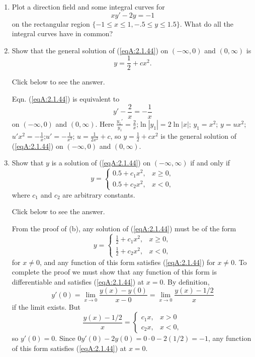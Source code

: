 \documentclass{ximera}
\begin{document}
\begin{problem}\label{exer:2.1.44}
\begin{enumerate}
\item %
Plot a direction field and some integral curves for
\begin{equation}\label{eqA:2.1.44}
    xy'-2y=-1
\end{equation}
on the rectangular region  $\{-1\leq x\leq 1, -.5\leq y\leq 1.5\}$.
What do all the integral curves have in common?

\item \label{part2.1.44b}%
Show that the general solution of (\ref{eqA:2.1.44})
on $(-\infty,0)$ and $(0,\infty)$ is
$$
y=\frac{1}{2}+cx^2.
$$

Click below to see the answer.

\begin{expandable}
    Eqn. (\ref{eqA:2.1.44}) is equivalent to
$$
y'-\frac{2}{ x}=-\frac{1}{ x}
$$
on $(-\infty,0)$ and $(0,\infty)$. Here
$\frac{y_1'}{ y_1}=\frac{2}{ x}$;\quad $\ln|y_1|=2\ln|x|$;\quad
$y_1=x^2$;\quad
$y=ux^2$;\quad $u'x^2=-\frac{1}{ x}$;\quad $u'=-\frac{1}{
x^3}$;\quad
$u=\frac{1}{2x^2}+c$, so $y=\frac{1}{2}+cx^2$ is the general
solution of (\ref{eqA:2.1.44}) on $(-\infty,0)$ and $(0,\infty)$.
\end{expandable}

\item %
Show that $y$ is a solution of (\ref{eqA:2.1.44}) on
$(-\infty,\infty)$ if and only if
$$
y=\left\{\begin{array}{ll}0.5+c_1x^2, &x
\ge 0,\\
0.5+c_2x^2, &x < 0,\end{array}\right.
$$
 where $c_1$ and $c_2$ are arbitrary constants.

 Click below to see the answer.

 \begin{expandable}
     From the proof of (b), any solution of (\ref{eqA:2.1.44}) must be of the form
$$
y=\left\{\begin{array}{ll}\frac{1}{2}+c_1x^2, &x
\ge 0,\\
\frac{1}{2}+c_2x^2, &x < 0,\end{array}\right.
$$
for $x\ne0$, and any function of this form
satisfies (\ref{eqA:2.1.44}) for $x\ne0$. To complete the proof we
must show that any function of this form is
differentiable and satisfies (\ref{eqA:2.1.44}) at $x=0$. By
definition,
$$
y'(0)=\lim_{x\to0}\frac{y(x)-y(0)}{ x-0}=\lim_{x\to0}\frac{y(x)-1/2}{
x}
$$
if the limit exists. But
$$
\frac{y(x)-1/2}{ x}=\left\{\begin{array}{cl} c_1x,&x>0\\
c_2x,&x<0,\end{array}\right.
$$
so $y'(0)=0$. Since $0y'(0)-2y(0)=0\cdot0-2(1/2)=-1$, any function of
this form satisfies (\ref{eqA:2.1.44}) at
$x=0$.
 \end{expandable}


\end{enumerate}
\end{problem}
\end{document}
